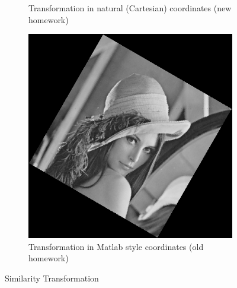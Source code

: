 \begin{figure}[htbp]
\begin{subfigure}[t]{0.4\textwidth}
		\caption{Transformation in natural (Cartesian) coordinates (new homework)}\label{fig:4b}
	\end{subfigure}
	\qquad
	\begin{subfigure}[t]{0.4\textwidth}
	    \centering
		\includegraphics[width=\textwidth]{hw2/problem1/lenal.png}
		\caption{Transformation in Matlab style coordinates (old homework)}\label{fig:4c}
	\end{subfigure}
	\caption{Similarity Transformation}\label{fig:4}
\end{figure}



\newpage


